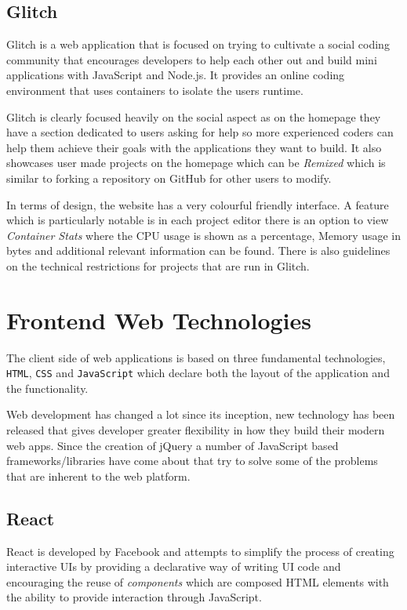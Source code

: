 \subsection{Glitch}
Glitch is a web application that is focused on trying to cultivate a social coding community that encourages developers to help each other out and build mini applications with JavaScript and Node.js. It provides an online coding environment that uses containers to isolate the users runtime.

Glitch is clearly focused heavily on the social aspect as on the homepage they have a section dedicated to users asking for help so more experienced coders can help them achieve their goals with the applications they want to build. It also showcases user made projects on the homepage which can be \textit{Remixed} which is similar to forking a repository on GitHub for other users to modify.

In terms of design, the website has a very colourful friendly interface. A feature which is particularly notable is in each project editor there is an option to view \textit{Container Stats} where the CPU usage is shown as a percentage, Memory usage in bytes and additional relevant information can be found. There is also guidelines on the technical restrictions for projects that are run in Glitch. 

\section{Frontend Web Technologies} \label{lit-frontend}

The client side of web applications is based on three fundamental technologies, \texttt{HTML}, \texttt{CSS} and \texttt{JavaScript} which declare both the layout of the application and the functionality.

Web development has changed a lot since its inception, new technology has been released that gives developer greater flexibility in how they build their modern web apps. Since the creation of jQuery \cite{jquery} a number of JavaScript based frameworks/libraries have come about that try to solve some of the problems that are inherent to the web platform.

\subsection{React}

React is developed by Facebook and attempts to simplify the process of creating interactive UIs by providing a declarative way of writing UI code and encouraging the reuse of \textit{components} which are composed HTML elements with the ability to provide interaction through JavaScript.

